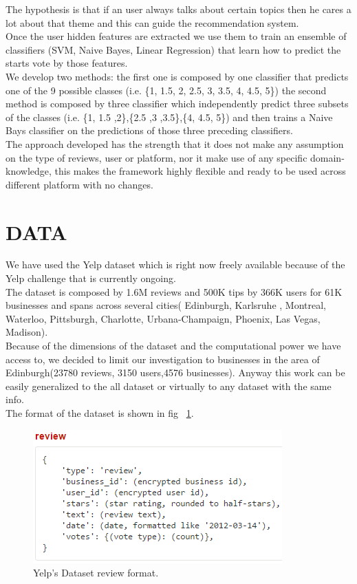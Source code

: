 \documentclass[11pt]{article}
\begin{document}
The hypothesis is that if an user always talks about certain topics then he cares a lot about that theme and this can guide the recommendation system.\\
Once the user hidden features are extracted we use them to train an ensemble of classifiers (SVM, Naive Bayes, Linear Regression) that learn how to predict the starts vote by those features.\\
We develop two methods: the first one is composed by one classifier that predicts one of the 9 possible classes (i.e. \{1, 1.5, 2, 2.5, 3, 3.5, 4, 4.5, 5\}) the second method is composed by three classifier which independently predict three subsets of the classes (i.e. \{1, 1.5 ,2\},\{2.5 ,3 ,3.5\},\{4, 4.5, 5\}) and then trains a Naive Bays classifier on the predictions of those three preceding classifiers.\\
The approach developed has the strength that it does not make any assumption on the type of reviews, user or platform, nor it make use of any specific domain-knowledge, this makes the framework highly flexible and ready to be used across different platform with no changes.

\section{DATA}
We have used the Yelp dataset\cite{yelp} which is right now freely available because of the Yelp challenge that is currently ongoing.\\
The dataset is composed by 1.6M reviews and 500K tips by 366K users for 61K businesses and spans across several cities( Edinburgh, Karlsruhe
, Montreal, Waterloo, Pittsburgh, Charlotte, Urbana-Champaign, Phoenix, Las Vegas, Madison).\\
Because of the dimensions of the dataset and the computational power we have access to, we decided to limit our investigation to businesses in the area of Edinburgh(23780 reviews, 3150 users,4576 businesses). Anyway this work can be easily generalized to the all dataset or virtually to any dataset with the same info.\\
The format of the dataset is shown in fig ~\ref{review}.
\begin{figure}[thpb]
	\includegraphics[scale=0.75]{img/review.png}
	\caption{Yelp's Dataset review format.}
	\label{review}
\end{figure}
\end{document}

